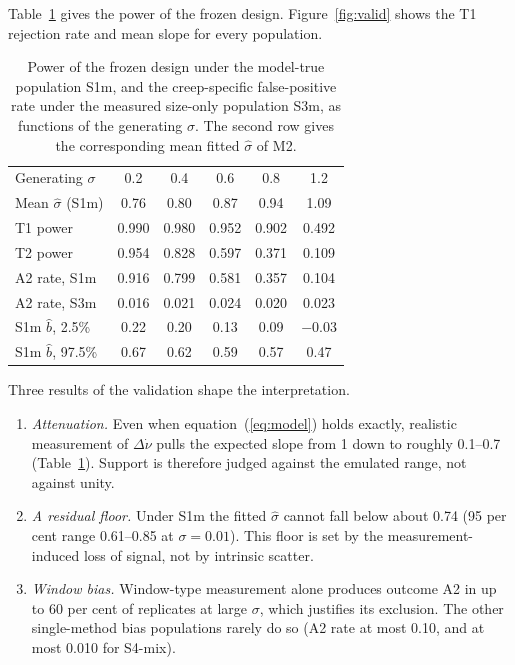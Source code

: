 \documentclass[fleqn,usenatbib]{mnras}
\newcommand{\bhat}{\hat b}
\newcommand{\shat}{\hat\sigma}
\begin{document}
Table~\ref{tab:power} gives the power of the frozen design.
Figure~\ref{fig:valid} shows the T1 rejection rate and mean slope for every
population.

\begin{table}
\centering
\caption{Power of the frozen design under the model-true population S1m,
and the creep-specific false-positive rate under the measured size-only
population S3m, as functions of the generating $\sigma$. The second row
gives the corresponding mean fitted $\shat$ of M2.}
\label{tab:power}
\small\setlength{\tabcolsep}{4pt}
\begin{tabular}{@{}lccccc@{}}
\toprule
Generating $\sigma$ & 0.2 & 0.4 & 0.6 & 0.8 & 1.2\\
Mean $\shat$ (S1m) & 0.76 & 0.80 & 0.87 & 0.94 & 1.09\\
\midrule
T1 power & 0.990 & 0.980 & 0.952 & 0.902 & 0.492\\
T2 power & 0.954 & 0.828 & 0.597 & 0.371 & 0.109\\
A2 rate, S1m & 0.916 & 0.799 & 0.581 & 0.357 & 0.104\\
A2 rate, S3m & 0.016 & 0.021 & 0.024 & 0.020 & 0.023\\
\midrule
S1m $\bhat$, 2.5\% & 0.22 & 0.20 & 0.13 & 0.09 & $-0.03$\\
S1m $\bhat$, 97.5\% & 0.67 & 0.62 & 0.59 & 0.57 & 0.47\\
\bottomrule
\end{tabular}
\end{table}

Three results of the validation shape the interpretation.
\begin{enumerate}
\item \emph{Attenuation.} Even when equation~(\ref{eq:model}) holds exactly,
realistic measurement of $\Delta\dot\nu$ pulls the expected slope from 1 down
to roughly 0.1--0.7 (Table~\ref{tab:power}). Support is therefore judged
against the emulated range, not against unity.
\item \emph{A residual floor.} Under S1m the fitted $\shat$ cannot fall
below about 0.74 (95 per cent range 0.61--0.85 at $\sigma=0.01$). This floor
is set by the measurement-induced loss of signal, not by intrinsic scatter.
\item \emph{Window bias.} Window-type measurement alone produces outcome A2
in up to 60 per cent of replicates at large $\sigma$, which justifies its
exclusion. The other single-method bias populations rarely do so
(A2 rate at most 0.10, and at most 0.010 for S4-mix).
\end{enumerate}
\end{document}
